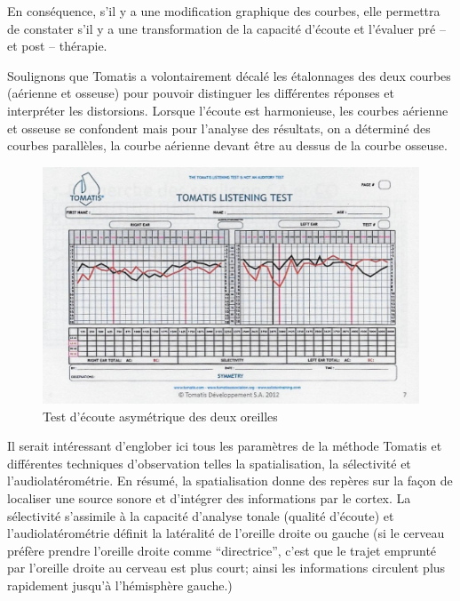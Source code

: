  En  conséquence,  s'il y a une modification
          graphique des courbes, elle
          permettra de constater s'il y a une transformation de la capacité d'écoute
          et l'évaluer pré -- et
          post -- thérapie.

Soulignons que Tomatis a volontairement décalé les étalonnages des deux courbes (aérienne et 
osseuse) pour pouvoir distinguer les différentes réponses et interpréter
	les distorsions. Lorsque l'écoute est harmonieuse, les
	courbes aérienne et osseuse se confondent mais pour l'analyse des
	résultats, on a déterminé des courbes parallèles, la courbe aérienne
	devant être au dessus de la courbe osseuse.
\begin{figure}
	\centering
	\includegraphics[width=0.8\linewidth]{images/tomatisListeningTest.jpg}
	\caption[Test d'écoute]{Test
          d'écoute asymétrique des deux oreilles}
	\label{Test d'écoute asymétrique avec oreille droite et oreille gauche}
\end{figure}
 Il serait intéressant d'englober ici tous les paramètres de la méthode Tomatis 
 et différentes techniques 
 d'observation telles la spatialisation, la sélectivité et l'audiolatérométrie. 
 En résumé, la spatialisation donne des repères sur la façon de localiser une source sonore et d'intégrer 
 des informations par le cortex. La sélectivité s'assimile à la capacité d'analyse tonale (qualité d'écoute) 
 et l'audiolatérométrie définit la latéralité de l'oreille droite ou gauche (si le cerveau préfère prendre 
 l'oreille droite comme
 ``directrice'', c'est que le trajet emprunté par l'oreille droite au cerveau est plus
 court; ainsi les informations circulent plus rapidement jusqu'à l'hémisphère gauche.)
